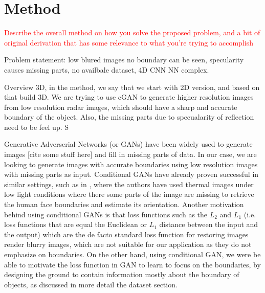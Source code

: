 \section{ Method}
\textcolor{red}{
Describe the overall method on how you solve the proposed problem, and a bit of original derivation that has some relevance to what you’re trying to accomplish
}

Problem statement: low blured images no boundary can be seen, specularity causes missing parts, no availbale dataset, 4D CNN NN complex.

Overview 3D, in the method, we say that we start with 2D version, and based on that build 3D. 
We are trying to use cGAN to generate higher resolution images from low resolution radar images, which should have a sharp and accurate boundary of the object. Also, the missing parts due to specualarity of reflection need to be feel up.  S

	
Generative Adverserial Networks (or GANs) have been widely used to generate images [cite some stuff here] and fill in missing parts of data. In our case, we are looking to generate images with accurate boundaries using low resolution images with missing parts as input. Conditional GANs have already proven successful in similar settings, such as in \cite{hams}, where the authors have used thermal images under low light conditions where there some parts of the image are missing to retrieve the human face boundaries and estimate its orientation. Another motivation behind using conditional GANs is that loss functions such as the $L_2$ and $L_1$ (i.e. loss functions that are equal the Euclidean or $L_1$ distance between the input and the output) which are the de facto standard loss function for restoring images render blurry images, which are not suitable for our application as they do not emphasize on boundaries. On the other hand, using conditional GAN, we were be able to motivate the loss function in GAN to learn to focus on the boundaries, by designing the ground to contain information mostly about the boundary of objects, as discussed in more detail the dataset section.
	
